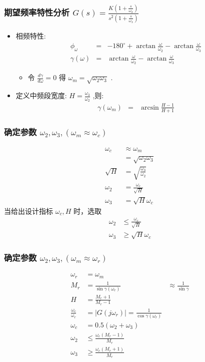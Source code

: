 \documentclass[table]{beamer}
\begin{document}
\begin{frame}
\frametitle{期望频率特性分析 $G(s)=\frac{K(1+\frac{s}{\omega_2})}{s^2(1+\frac{s}{\omega_3})}$}
\label{sec-1-3}

\begin{itemize}
\item 相频特性:
     \begin{eqnarray*}
     \phi_{\omega} &=& -180^{\circ}+\arctan\frac{\omega}{\omega_2}-\arctan\frac{\omega}{\omega_3} \\
     \gamma(\omega) &=& \arctan\frac{\omega}{\omega_2}-\arctan\frac{\omega}{\omega_3} 
     \end{eqnarray*}
\begin{itemize}
\item 令  $\frac{d\gamma}{d\omega}=0$  得  $\omega_m=\sqrt{\omega_2\omega_3}$  .
\end{itemize}
\item <2->定义中频段宽度:  $H=\frac{\omega_3}{\omega_2}$ ,则:
     \begin{eqnarray*}
     \gamma(\omega_m) &= &\arcsin\frac{H-1}{H+1} 
     \end{eqnarray*}
\end{itemize}
\end{frame}
\begin{frame}
\frametitle{确定参数 $\omega_2,\omega_3,(\omega_m\approx\omega_c)$}
\label{sec-1-4}

\begin{align*}
\omega_c &\approx\omega_m \\
         &=\sqrt{\omega_2\omega_3}\\
\sqrt{H} &=\sqrt{\frac{\omega_3}{\omega_2}}\\
\omega_2 & = \frac{\omega_c}{\sqrt{H}} \\
\omega_3 & = \sqrt{H}\omega_c
\end{align*}
当给出设计指标 $\omega_c,H$ 时，选取
\begin{align*}
\omega_2 &\leq \frac{\omega_c}{\sqrt{H}} \\
\omega_3 &\geq \sqrt{H}\omega_c
\end{align*}
\end{frame}
\begin{frame}
\frametitle{确定参数 $\omega_2,\omega_3,(\omega_m\approx\omega_r)$}
\label{sec-1-5}

\begin{align*}
\omega_r &=\omega_m \\
M_r &=\frac{1}{\sin\gamma(\omega_r)}&\approx \frac{1}{\sin\gamma} \\
H &=\frac{M_r+1}{M_r-1}\\
\frac{\omega_c}{\omega_r} &=|G(j\omega_r)|=\frac{1}{\cos\gamma(\omega_r)}\\
\omega_c &=0.5(\omega_2+\omega_3)\\
\omega_2 & \leq \frac{\omega_c(M_r-1)}{M_r} \\
\omega_3 & \geq \frac{\omega_c(M_r+1)}{M_r} 
\end{align*}
\end{frame}
\end{document}
